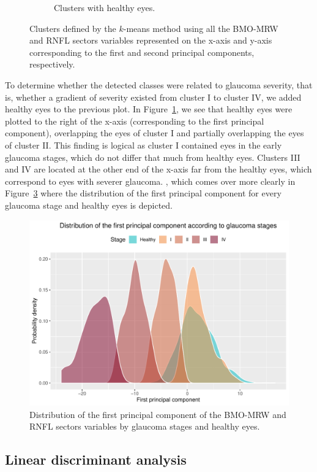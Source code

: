 \documentclass[jcm,article,submit,moreauthors,pdftex]{Definitions/mdpi}
\begin{document}
\begin{figure}
\begin{subfigure}[b]{0.49\textwidth}
\caption{Clusters with healthy eyes.}
\label{fig:clusters-with-healthy-eyes}
\end{subfigure}
\caption{Clusters defined by the $k$-means method using all the BMO-MRW and RNFL sectors variables represented on the x-axis and y-axis corresponding to the first and second principal components, respectively.}
\label{fig:clusters}
\end{figure}

To determine whether the detected classes were related to glaucoma severity, that is, whether a gradient of severity existed from cluster I to cluster IV, we added healthy eyes to the previous plot. In Figure~\ref{fig:clusters-with-healthy-eyes}, we see that healthy eyes were plotted to the right of the x-axis (corresponding to the first principal component), overlapping the eyes of cluster I and partially overlapping the eyes of cluster II. This finding is logical as cluster I contained eyes in the early glaucoma stages, which do not differ that much from healthy eyes. Clusters III and IV are located at the other end of the x-axis far from the healthy eyes, which correspond to eyes with severer glaucoma. , which comes over more clearly in Figure~\ref{fig:clusters-distributions} where the distribution of the first principal component for every glaucoma stage and healthy eyes is depicted.

\begin{figure}[ht]
\centering
\includegraphics[width=0.5\linewidth]{img/clusters-distributions.pdf}
\caption{Distribution of the first principal component of the BMO-MRW and RNFL sectors variables by glaucoma stages and healthy eyes.}
\label{fig:clusters-distributions}
\end{figure}

\subsection{Linear discriminant analysis}
\end{document}
